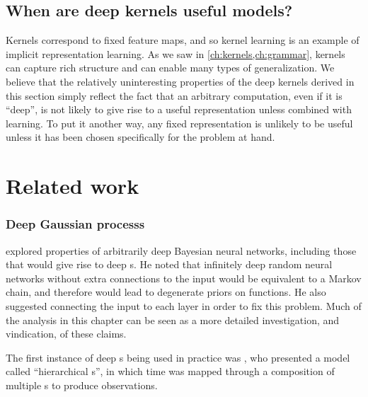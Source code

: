 \subsection{When are deep kernels useful models?}

Kernels correspond to fixed feature maps, and so kernel learning is an example of implicit representation learning. %
As we saw in \cref{ch:kernels,ch:grammar}, kernels can capture rich structure and can enable many types of generalization.
We believe that the relatively uninteresting properties of the deep kernels derived in this section simply reflect the fact that an arbitrary computation, even if it is ``deep'', is not likely to give rise to a useful representation unless combined with learning.
To put it another way, any fixed representation is unlikely to be useful unless it has been chosen specifically for the problem at hand.






\section{Related work}

\subsubsection{Deep Gaussian processs}
\citet[chapter 2]{neal1995bayesian} explored properties of arbitrarily deep Bayesian neural networks, including those that would give rise to deep \gp{}s.
He noted that infinitely deep random neural networks without extra connections to the input would be equivalent to a Markov chain, and therefore would lead to degenerate priors on functions.
He also suggested connecting the input to each layer in order to fix this problem.
Much of the analysis in this chapter can be seen as a more detailed investigation, and vindication, of these claims.

The first instance of deep \gp{}s being used in practice was \citep{lawrence2007hierarchical}, who presented a model called ``hierarchical \gplvm{}s'', in which time was mapped through a composition of multiple \gp{}s to produce observations.

